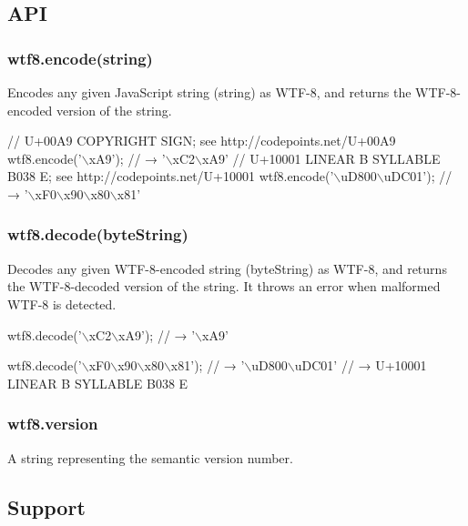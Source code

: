 \subsection*{A\+PI}

\subsubsection*{{\ttfamily wtf8.\+encode(string)}}

Encodes any given Java\+Script string ({\ttfamily string}) as W\+T\+F-\/8, and returns the W\+T\+F-\/8-\/encoded version of the string.


\begin{DoxyCode}
// U+00A9 COPYRIGHT SIGN; see http://codepoints.net/U+00A9
wtf8.encode('\(\backslash\)xA9');
// → '\(\backslash\)xC2\(\backslash\)xA9'
// U+10001 LINEAR B SYLLABLE B038 E; see http://codepoints.net/U+10001
wtf8.encode('\(\backslash\)uD800\(\backslash\)uDC01');
// → '\(\backslash\)xF0\(\backslash\)x90\(\backslash\)x80\(\backslash\)x81'
\end{DoxyCode}


\subsubsection*{{\ttfamily wtf8.\+decode(byte\+String)}}

Decodes any given W\+T\+F-\/8-\/encoded string ({\ttfamily byte\+String}) as W\+T\+F-\/8, and returns the W\+T\+F-\/8-\/decoded version of the string. It throws an error when malformed W\+T\+F-\/8 is detected.


\begin{DoxyCode}
wtf8.decode('\(\backslash\)xC2\(\backslash\)xA9');
// → '\(\backslash\)xA9'

wtf8.decode('\(\backslash\)xF0\(\backslash\)x90\(\backslash\)x80\(\backslash\)x81');
// → '\(\backslash\)uD800\(\backslash\)uDC01'
// → U+10001 LINEAR B SYLLABLE B038 E
\end{DoxyCode}


\subsubsection*{{\ttfamily wtf8.\+version}}

A string representing the semantic version number.

\subsection*{Support}

